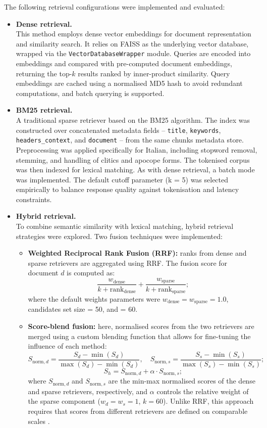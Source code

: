 \begin{spacing}{1.5}
\noindent The following retrieval configurations were implemented and evaluated:
\begin{itemize}
    \item \textbf{Dense retrieval.}\\
    This method employs dense vector embeddings for document representation and similarity search. It relies on FAISS as the underlying vector database, wrapped via the \texttt{VectorDatabaseWrapper} module. Queries are encoded into embeddings and compared with pre-computed document embeddings, returning the top-$k$ results ranked by inner-product similarity. Query embeddings are cached using a normalised MD5 hash to avoid redundant computations, and batch querying is supported.
    \item \textbf{BM25 retrieval.}\\ 
    A traditional sparse retriever based on the BM25 algorithm. The index was constructed over concatenated metadata fields -- \texttt{title}, \texttt{keywords}, \texttt{headers\_context}, and \texttt{document} -- from the same chunks metadata store. Preprocessing was applied specifically for Italian, including stopword removal, stemming, and handling of clitics and apocope forms. The tokenised corpus was then indexed for lexical matching. As with dense retrieval, a batch mode was implemented. The default cutoff parameter (k = 5) was selected empirically to balance response quality against tokenisation and latency constraints.
    \item \textbf{Hybrid retrieval.}\\ 
    To combine semantic similarity with lexical matching, hybrid retrieval strategies were explored. Two fusion techniques were implemented:
    \begin{itemize}
            \item \textbf{Weighted Reciprocal Rank Fusion (RRF):} ranks from dense and sparse retrievers are aggregated using RRF. The fusion score for document $d$ is computed as:
\[
\frac{w_\mathrm{dense}}{k + \mathrm{rank}_\mathrm{dense}} + \frac{w_\mathrm{sparse}}{k + \mathrm{rank}_\mathrm{sparse}} ;
\]
where the default weights parameters were $w_{\text{dense}} = w_{\text{sparse}} = 1.0$, candidates set size = 50, and  = 60.
            \item \textbf{Score-blend fusion:} here, normalised scores from the two retrievers are merged using a custom blending function that allows for fine-tuning the influence of each method:
\[
S_{\text{norm},d} = \frac{S_d - \min(S_d)}{\max(S_d) - \min(S_d)}, \quad  
S_{\text{norm},s} = \frac{S_s - \min(S_s)}{\max(S_s) - \min(S_s)} 
;\]
\[
S_h = S_{\text{norm},d} + \alpha \cdot S_{\text{norm},s} ;
\]
where $S_{\text{norm},d}$ and $S_{\text{norm},s}$ are the min-max normalised scores of the dense and sparse retrievers, respectively, and $\alpha$ controls the relative weight of the sparse component ($w_d = w_s = 1$, $k = 60$). Unlike RRF, this approach requires that scores from different retrievers are defined on comparable scales \parencite{wang_searching_2024}.
\end{itemize}
\end{itemize}




\end{spacing}
